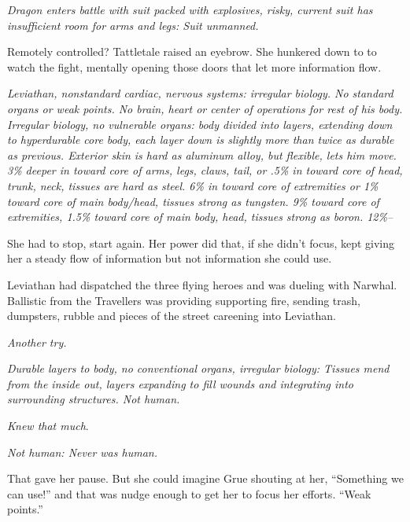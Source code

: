 \emph{Dragon enters battle with suit packed with explosives, risky, current suit has insufficient room for arms and legs: Suit unmanned.}



Remotely controlled?  Tattletale raised an eyebrow.  She hunkered down to to watch the fight, mentally opening those doors that let more information flow.



\emph{Leviathan, nonstandard cardiac, nervous systems: irregular biology.  No standard organs or weak points.  No brain, heart or center of operations for rest of his body. Irregular biology, no vulnerable organs: body divided into layers, extending down to hyperdurable core body, each layer down is slightly more than twice as durable as previous. Exterior skin is hard as aluminum alloy, but flexible, lets him move.  3\% deeper in toward core of arms, legs, claws, tail, or .5\% in toward core of head, trunk, neck, tissues are hard as steel.  6\% in toward core of extremities or 1\% toward core of main body/head, tissues strong as tungsten.  9\% toward core of extremities, 1.5\% toward core of main body, head, tissues strong as boron.  12\%--}



She had to stop, start again.  Her power did that, if she didn't focus, kept giving her a steady flow of information but not information she could use.



Leviathan had dispatched the three flying heroes and was dueling with Narwhal.  Ballistic from the Travellers was providing supporting fire, sending trash, dumpsters, rubble and pieces of the street careening into Leviathan.



\emph{Another try.}



\emph{Durable layers to body, no conventional organs, irregular biology: Tissues mend from the inside out, layers expanding to fill wounds and integrating into surrounding structures.  Not human.}



\emph{Knew that much}.



\emph{Not human: Never was human.}



That gave her pause.  But she could imagine Grue shouting at her, ``Something we can use!'' and that was nudge enough to get her to focus her efforts.  ``Weak points.''



